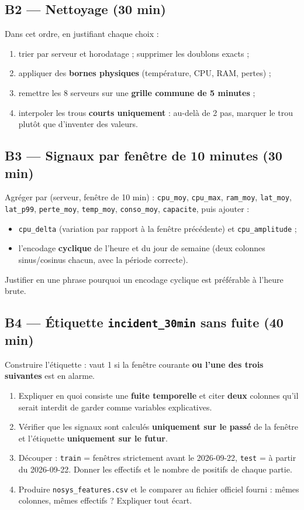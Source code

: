 \documentclass[11pt,a4paper]{article}
\newcommand{\py}[1]{\texttt{\small #1}}
\newcommand{\file}[1]{\texttt{\small #1}}
\begin{document}
\subsection*{B2 --- Nettoyage (30 min)}
Dans cet ordre, en justifiant chaque choix :
\begin{enumerate}
\item trier par serveur et horodatage ; supprimer les doublons exacts ;
\item appliquer des \textbf{bornes physiques} (température, CPU, RAM, pertes) ;
\item remettre les 8 serveurs sur une \textbf{grille commune de 5 minutes} ;
\item interpoler les trous \textbf{courts uniquement} : au-delà de 2 pas,
marquer le trou plutôt que d'inventer des valeurs.
\end{enumerate}

\subsection*{B3 --- Signaux par fenêtre de 10 minutes (30 min)}
Agréger par (serveur, fenêtre de 10 min) : \py{cpu\_moy}, \py{cpu\_max},
\py{ram\_moy}, \py{lat\_moy}, \py{lat\_p99}, \py{perte\_moy}, \py{temp\_moy},
\py{conso\_moy}, \py{capacite}, puis ajouter :
\begin{itemize}
\item \py{cpu\_delta} (variation par rapport à la fenêtre précédente) et
\py{cpu\_amplitude} ;
\item l'encodage \textbf{cyclique} de l'heure et du jour de semaine
(deux colonnes sinus/cosinus chacun, avec la période correcte).
\end{itemize}
Justifier en une phrase pourquoi un encodage cyclique est préférable à
l'heure brute.

\subsection*{B4 --- Étiquette \file{incident\_30min} sans fuite (40 min)}
Construire l'étiquette : vaut 1 si la fenêtre courante \textbf{ou l'une des
trois suivantes} est en alarme.
\begin{enumerate}
\item Expliquer en quoi consiste une \textbf{fuite temporelle} et citer
\textbf{deux} colonnes qu'il serait interdit de garder comme variables
explicatives.
\item Vérifier que les signaux sont calculés \textbf{uniquement sur le passé}
de la fenêtre et l'étiquette \textbf{uniquement sur le futur}.
\item Découper : \py{train} = fenêtres strictement avant le 2026-09-22,
\py{test} = à partir du 2026-09-22. Donner les effectifs et le nombre de
positifs de chaque partie.
\item Produire \file{nosys\_features.csv} et le comparer au fichier officiel
fourni : mêmes colonnes, mêmes effectifs ? Expliquer tout écart.
\end{enumerate}
\end{document}
